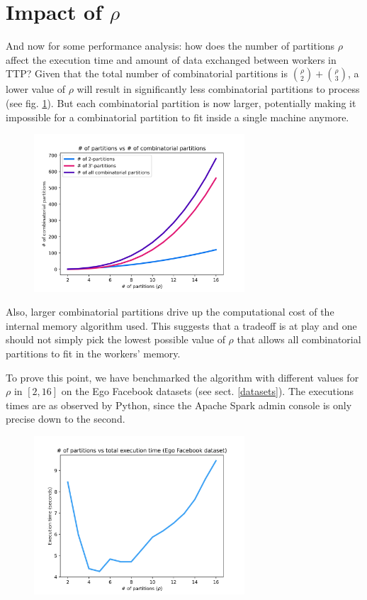 \documentclass[paper=a4, fontsize=11pt]{scrartcl}
\begin{document}
\section{Impact of $\rho$}
And now for some performance analysis: how does the number of partitions $\rho$
affect the execution time and amount of data exchanged between workers in TTP?
Given that the total number of combinatorial partitions is $\binom{\rho}{2} +
\binom{\rho}{3}$, a lower value of $\rho$ will result in significantly less
combinatorial partitions to process (see fig. \ref{rho_comb}). But each
combinatorial partition is now larger, potentially making it impossible for a
combinatorial partition to fit inside a single machine anymore.

\begin{figure}[htb]
    \centering
    \includegraphics[width=0.7\textwidth]{img/rho_comb}
    \caption{} \label{rho_comb}
\end{figure}

Also, larger combinatorial partitions drive up the computational cost of the
internal memory algorithm used. This suggests that a tradeoff is at play and one
should not simply pick the lowest possible value of $\rho$ that allows all
combinatorial partitions to fit in the workers' memory.

To prove this point, we have benchmarked the algorithm with different values for
$\rho$ in $[2, 16]$ on the Ego Facebook datasets (see sect. \ref{datasets}). The
executions times are as observed by Python, since the Apache Spark admin console
is only precise down to the second.

\begin{figure}[htb]
    \centering
    \includegraphics[width=0.7\textwidth]{img/rho_time}
    \caption{} \label{rho_time}
\end{figure}
\end{document}
